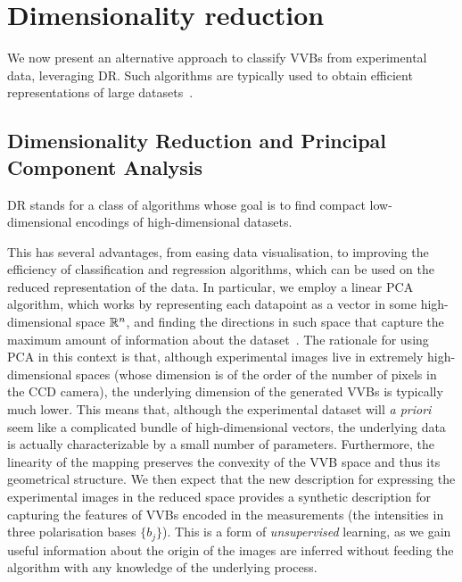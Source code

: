 \section{Dimensionality reduction}
\label{sec:VVBs:dimensionality_reduction}

We now present an alternative approach to classify \acp{VVB} from experimental data, leveraging \ac{DR}.
Such algorithms are typically used to obtain efficient representations of large datasets~\cite{cunningham2008dimension,fodor2002survey}.

\subsection{Dimensionality Reduction and Principal Component Analysis}

\acf{DR} stands for a class of algorithms whose goal is to find compact low-dimensional encodings of high-dimensional datasets.

This has several advantages, from easing data visualisation, to improving the efficiency of classification and regression algorithms, which can be used on the reduced representation of the data.
In particular, we employ a linear 
\ac{PCA} algorithm, which works by representing each datapoint as a vector in some high-dimensional space $\mathbb{R}^n$, and finding the directions in such space that capture the maximum amount of information about the dataset~\cite{jolliffe2011principal,jolliffe2016principal}.
The rationale for using \ac{PCA} in this context is that, although experimental images live in extremely high-dimensional spaces (whose dimension is of the order of the number of pixels in the \ac{CCD} camera), the underlying dimension of the generated \acp{VVB} is typically much lower.
This means that, although the experimental dataset will \emph{a priori} seem like a complicated bundle of high-dimensional vectors, the underlying data is actually characterizable by a small number of parameters. Furthermore, the linearity of the mapping preserves the convexity of the VVB space and thus its geometrical structure. We then expect that the new description for expressing the experimental images in the reduced space provides a synthetic description for capturing the features of VVBs encoded in the measurements (the intensities in three polarisation bases $\{b_j\}$).
This is a form of \emph{unsupervised} learning, as we gain useful information about the origin of the images are inferred without feeding the algorithm with any knowledge of the underlying process.

